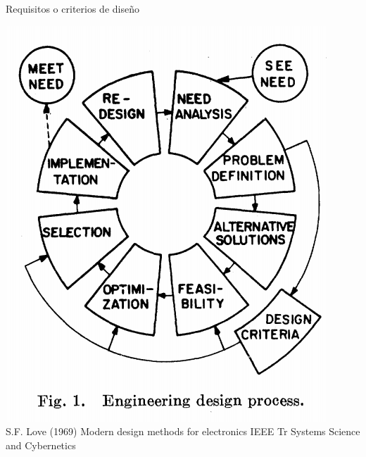 \documentclass[presentation,aspectratio=169]{beamer}
\begin{document}
\begin{frame}[label={sec:org9fd4645}]{Requisitos o criterios de diseño}
 \begin{center}
\includegraphics[height=0.6\textheight]{../../figures/design-process-fig1.png}\\
{\footnotesize  S.F. Love (1969) Modern design methods for electronics IEEE Tr Systems Science and Cybernetics}
\end{center}
\end{frame}
\end{document}
